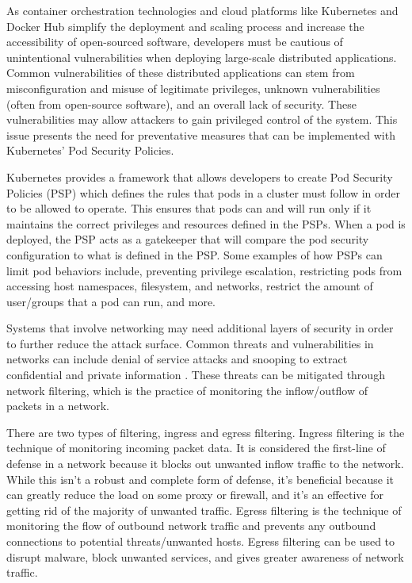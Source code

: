 


As container orchestration technologies and cloud platforms like Kubernetes and Docker Hub simplify 
the deployment and scaling process and increase the accessibility of open-sourced software, developers 
must be cautious of unintentional vulnerabilities when deploying large-scale distributed applications. 
Common vulnerabilities of these distributed applications can stem from misconfiguration and misuse of 
legitimate privileges, unknown vulnerabilities (often from open-source software), and an overall lack 
of security. These vulnerabilities may allow attackers to gain privileged control of the system. This 
issue presents the need for preventative measures that can be implemented with Kubernetes' Pod Security 
Policies. 

Kubernetes provides a framework that allows developers to create Pod Security Policies (PSP) which 
defines the rules that pods in a cluster must follow in order to be allowed to operate. This ensures 
that pods can and will run only if it maintains the correct privileges and resources defined in the PSPs. 
When a pod is deployed, the PSP acts as a  gatekeeper that will compare the pod security configuration to 
what is defined  in the PSP. Some examples of how PSPs can limit pod behaviors include, preventing 
privilege escalation, restricting pods from accessing host namespaces, filesystem, and networks, restrict 
the amount of user/groups that a pod can run, and more.

Systems that involve networking may need additional layers of security in order to further reduce the 
attack surface. Common threats and vulnerabilities in networks can include denial of service attacks 
and snooping to extract confidential and private information \cite{mns}. These threats can be mitigated 
through network filtering, which is the practice of monitoring the inflow/outflow of packets in a network. 

There are two types of filtering, ingress and egress filtering. Ingress filtering is the technique of 
monitoring incoming packet data. It is considered the first-line of defense in a network because it blocks 
out unwanted inflow traffic to the network. While this isn't a robust and complete form of defense, it's 
beneficial because it can greatly reduce the load on some proxy or firewall, and it's an effective for 
getting rid of the majority of unwanted traffic. Egress filtering is the technique of monitoring the flow 
of outbound network traffic and prevents any outbound connections to potential threats/unwanted hosts. 
Egress filtering can be used to disrupt malware, block unwanted services, and gives greater awareness of 
network traffic.

